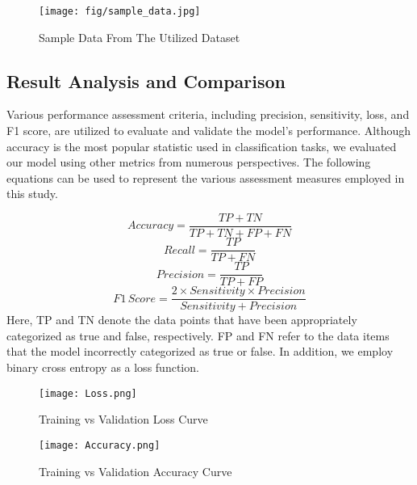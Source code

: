 \documentclass[conference]{IEEEtran}
\begin{document}
\begin{figure}['ht']
\centerline{\texttt{[image: fig/sample\_data.jpg]}}
\caption{Sample Data From The Utilized Dataset}
\label{data_fig}
\end{figure}

\subsection{Result Analysis and Comparison}


Various performance assessment criteria, including precision, sensitivity, loss, and F1 score, are utilized to evaluate and validate the model's performance. Although accuracy is the most popular statistic used in classification tasks, we evaluated our model using other metrics from numerous perspectives. The following equations can be used to represent the various assessment measures employed in this study.

\begin{equation}
Accuracy = \frac{TP+TN}{TP + TN + FP + FN}
\end{equation}
\begin{equation}
Recall = \frac{TP}{TP + FN}
\end{equation}
\begin{equation}
Precision = \frac{TP}{TP + FP} 
\end{equation}
\begin{equation}
F1\,Score = \frac{2 \times Sensitivity \times Precision}{Sensitivity + Precision}    
\end{equation}
Here, TP and TN denote the data points that have been appropriately categorized as true and false, respectively. FP and FN refer to the data items that the model incorrectly categorized as true or false. In addition, we employ binary cross entropy as a loss function.

\begin{figure}['ht']
\centerline{\texttt{[image: Loss.png]}}
\caption{Training vs Validation Loss Curve}
\label{loss_fig}
\end{figure}

\begin{figure}['ht']
\centerline{\texttt{[image: Accuracy.png]}}
\caption{Training vs Validation Accuracy Curve}
\label{acc_fig}
\end{figure}
\end{document}
